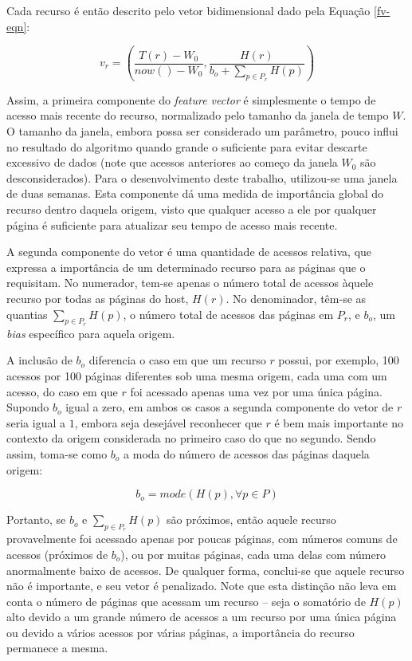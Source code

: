 \documentclass[10pt,twocolumn,letterpaper]{article}
\begin{document}
Cada recurso é então descrito pelo vetor bidimensional dado pela Equação \ref{fv-eqn}:

\begin{equation}
\label{fv-eqn}
v_{r} = \left( \frac{T(r) - W_0}{now() - W_0}, \frac{H(r)}{b_{o} + \sum_{p \in P_{r}} H(p)} \right)
\end{equation}

Assim, a primeira componente do \emph{feature vector} é simplesmente o tempo de acesso mais recente do recurso, normalizado pelo tamanho da janela de tempo $W$. O tamanho da janela, embora possa ser considerado um parâmetro, pouco influi no resultado do algoritmo quando grande o suficiente para evitar descarte excessivo de dados (note que acessos anteriores ao começo da janela $W_0$ são desconsiderados). Para o desenvolvimento deste trabalho, utilizou-se uma janela de duas semanas. Esta componente dá uma medida de importância global do recurso dentro daquela origem, visto que qualquer acesso a ele por qualquer página é suficiente para atualizar seu tempo de acesso mais recente.

A segunda componente do vetor é uma quantidade de acessos relativa, que expressa a importância de um determinado recurso para as páginas que o requisitam. No numerador, tem-se apenas o número total de acessos àquele recurso por todas as páginas do host, $H(r)$. No denominador, têm-se as quantias $\sum_{p \in P_{r}} H(p)$, o número total de acessos das páginas em $P_{r}$, e $b_{o}$, um \emph{bias} específico para aquela origem.

A inclusão de $b_{o}$ diferencia o caso em que um recurso $r$ possui, por exemplo, 100 acessos por 100 páginas diferentes sob uma mesma origem, cada uma com um acesso, do caso em que $r$ foi acessado apenas uma vez por uma única página. Supondo $b_{o}$ igual a zero, em ambos os casos a segunda componente do vetor de $r$ seria igual a $1$, embora seja desejável reconhecer que $r$ é bem mais importante no contexto da origem considerada no primeiro caso do que no segundo. Sendo assim, toma-se como $b_{o}$ a moda do número de acessos das páginas daquela origem:

\begin{equation}
b_{o} = mode(H(p), \forall p \in P)
\end{equation}

Portanto, se $b_{o}$ e $\sum_{p \in P_{r}} H(p)$ são próximos, então aquele recurso provavelmente foi acessado apenas por poucas páginas, com números comuns de acessos (próximos de $b_{o}$), ou por muitas páginas, cada uma delas com número anormalmente baixo de acessos. De qualquer forma, conclui-se que aquele recurso não é importante, e seu vetor é penalizado. Note que esta distinção não leva em conta o número de páginas que acessam um recurso -- seja o somatório de $H(p)$ alto devido a um grande número de acessos a um recurso por uma única página ou devido a vários acessos por várias páginas, a importância do recurso permanece a mesma.
\end{document}
